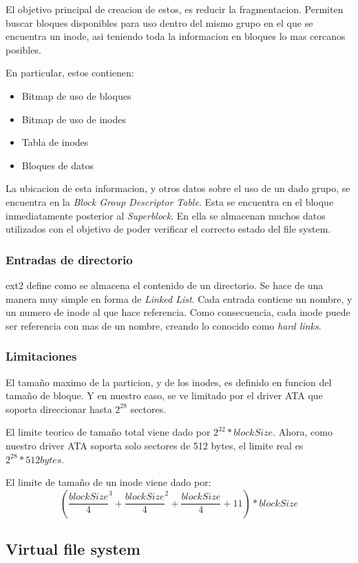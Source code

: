 \documentclass[a4paper,10pt]{article}
\begin{document}
El objetivo principal de creacion de estos, es reducir la fragmentacion. 
Permiten buscar bloques disponibles para uso dentro del mismo grupo en el que se encuentra un inode, asi teniendo toda la informacion en bloques lo mas cercanos posibles.

En particular, estos contienen:
\begin{itemize}
\item Bitmap de uso de bloques
\item Bitmap de uso de inodes
\item Tabla de inodes
\item Bloques de datos
\end{itemize}

La ubicacion de esta informacion, y otros datos sobre el uso de un dado grupo, se encuentra en la \textit{Block Group Descriptor Table}.
Esta se encuentra en el bloque inmediatamente posterior al \textit{Superblock}.
En ella se almacenan muchos datos utilizados con el objetivo de poder verificar el correcto estado del file system.

\subsubsection{Entradas de directorio}
ext2 define como se almacena el contenido de un directorio.
Se hace de una manera muy simple en forma de \textit{Linked List}.
Cada entrada contiene un nombre, y un numero de inode al que hace referencia.
Como consecuencia, cada inode puede ser referencia con mas de un nombre, creando lo conocido como \textit{hard links}.

\subsubsection{Limitaciones}
El tamaño maximo de la particion, y de los inodes, es definido en funcion del tamaño de bloque.
Y en nuestro caso, se ve limitado por el driver ATA que soporta direccionar hasta $ 2^{28} $ sectores.

El limite teorico de tamaño total viene dado por $ 2^{32} * blockSize $.
Ahora, como nuestro driver ATA soporta solo sectores de 512 bytes, el limite real es $ 2^{28} * 512 bytes $.

El limite de tamaño de un inode viene dado por:
$$( \frac{blockSize}{4}^3 + \frac{blockSize}{4}^2 + \frac{blockSize}{4} + 11 ) * blockSize $$

\subsection{Virtual file system}
\end{document}

